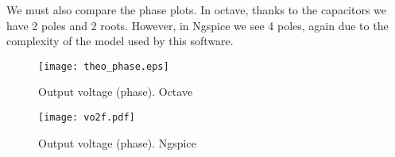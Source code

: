 We must also compare the phase plots. In octave, thanks to the capacitors we have 2 poles and 2 roots. However, in Ngspice we see 4 poles, again due to the complexity of the model used by this software.


\begin{figure}[ht]
\centering
\parbox{.49\linewidth}{
  \centering
  \texttt{[image: theo\_phase.eps]}
  \caption{Output voltage (phase). Octave}
  \label{fig:si} }
\parbox{.49\linewidth}{
  \centering
  \texttt{[image: vo2f.pdf]}
  \caption{Output voltage (phase). Ngspice}
  \label{fig:sim6}

}
\end{figure}




